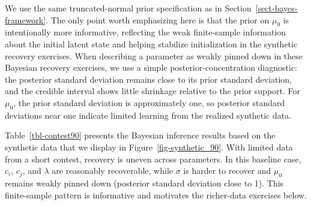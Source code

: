\documentclass[mnsc]{informs3}
\begin{document}
We use the same truncated-normal prior specification as in Section~\ref{sect-bayes-framework}.
The only point worth emphasizing here is that the prior on $\mu_0$ is intentionally more informative, reflecting the weak finite-sample information about the initial latent state and helping stabilize initialization in the synthetic recovery exercises.
When describing a parameter as weakly pinned down in these Bayesian recovery exercises, we use a simple posterior-concentration diagnostic: the posterior standard deviation remains close to its prior standard deviation, and the credible interval shows little shrinkage relative to the prior support.
For $\mu_0$, the prior standard deviation is approximately one, so posterior standard deviations near one indicate limited learning from the realized synthetic data.

Table~\ref{tbl-contest90} presents the Bayesian inference results based on the synthetic data that we display in Figure~\ref{fig-synthetic_90}.
With limited data from a short contest, recovery is uneven across parameters.
In this baseline case, $c_i$, $c_j$, and $\lambda$ are reasonably recoverable, while $\sigma$ is harder to recover and $\mu_0$ remains weakly pinned down (posterior standard deviation close to 1).
This finite-sample pattern is informative and motivates the richer-data exercises below.
\end{document}
